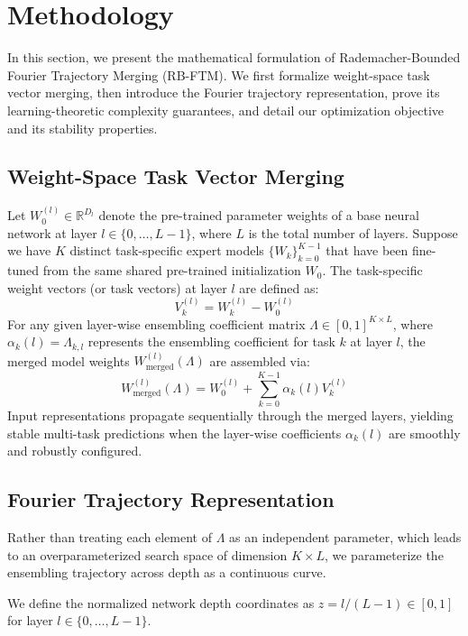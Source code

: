 \section{Methodology}
\label{sec:method}

In this section, we present the mathematical formulation of Rademacher-Bounded Fourier Trajectory Merging (RB-FTM). We first formalize weight-space task vector merging, then introduce the Fourier trajectory representation, prove its learning-theoretic complexity guarantees, and detail our optimization objective and its stability properties.

\subsection{Weight-Space Task Vector Merging}
Let $W_0^{(l)} \in \mathbb{R}^{D_l}$ denote the pre-trained parameter weights of a base neural network at layer $l \in \{0, \dots, L-1\}$, where $L$ is the total number of layers. Suppose we have $K$ distinct task-specific expert models $\{W_k\}_{k=0}^{K-1}$ that have been fine-tuned from the same shared pre-trained initialization $W_0$. The task-specific weight vectors (or task vectors) at layer $l$ are defined as:
\begin{equation}
    V_k^{(l)} = W_k^{(l)} - W_0^{(l)}
\end{equation}
For any given layer-wise ensembling coefficient matrix $\Lambda \in [0, 1]^{K \times L}$, where $\alpha_k(l) = \Lambda_{k,l}$ represents the ensembling coefficient for task $k$ at layer $l$, the merged model weights $W_{\text{merged}}^{(l)}(\Lambda)$ are assembled via:
\begin{equation}
    W_{\text{merged}}^{(l)}(\Lambda) = W_0^{(l)} + \sum_{k=0}^{K-1} \alpha_k(l) V_k^{(l)}
\end{equation}
Input representations propagate sequentially through the merged layers, yielding stable multi-task predictions when the layer-wise coefficients $\alpha_k(l)$ are smoothly and robustly configured.

\subsection{Fourier Trajectory Representation}
Rather than treating each element of $\Lambda$ as an independent parameter, which leads to an overparameterized search space of dimension $K \times L$, we parameterize the ensembling trajectory across depth as a continuous curve. 

We define the normalized network depth coordinates as $z = l / (L-1) \in [0, 1]$ for layer $l \in \{0, \dots, L-1\}$. 

